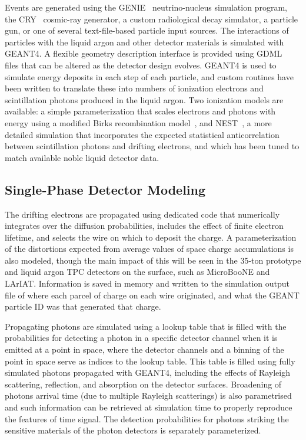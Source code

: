 Events are generated using the GENIE~\cite{GENIE} neutrino-nucleus
simulation program, the CRY~\cite{Cosmic-CRY,Cosmic-CRY-protons,CRY-url} 
cosmic-ray generator, a custom radiological decay simulator, a particle gun, or one of several
text-file-based particle input sources.  The interactions of particles
with the liquid argon and other detector materials is simulated with
GEANT4.  A flexible geometry description interface is provided using
GDML~\cite{gdml} files that can be altered as the detector design
evolves.  GEANT4 is used to simulate energy deposits in each step of
each particle, and custom routines have been written to translate
these into numbers of ionization electrons and scintillation photons
produced in the liquid argon.  Two ionization models are available: a
simple parameterization that scales electrons and photons with energy
using a modified Birks recombination model~\cite{Birks:1964zz,Doke:1988dp}, and
NEST~\cite{Szydagis:2013sih,Szydagis:2011tk}, a more detailed simulation that incorporates the
expected statistical anticorrelation between scintillation photons and
drifting electrons, and which has been tuned to match available noble
liquid detector data.

\subsection{Single-Phase Detector Modeling}

The drifting electrons are propagated using dedicated code that
numerically integrates over the diffusion probabilities, includes the
effect of finite electron lifetime, and selects the wire on which to
deposit the charge.  A parameterization of the distortions expected
from average values of space charge accumulations is also modeled,
though the main impact of this will be seen in the 35-ton prototype
and liquid argon TPC detectors on the surface, such as
MicroBooNE and LArIAT.  Information is
saved in memory and written to the simulation output file of where
each parcel of charge on each wire originated, and what the GEANT
particle ID was that generated that charge.

Propagating photons are simulated using a lookup table that is filled
with the probabilities for detecting a photon in a specific detector channel
when it is emitted at a point in space, where the detector channels
and a binning of the point in space serve as indices to the lookup table.
This table is filled using fully simulated photons propagated with GEANT4, including the effects
of Rayleigh scattering, reflection, and absorption on the detector
surfaces.  
Broadening of  photons arrival time (due to multiple Rayleigh scatterings)
is also parametrised and such information can be retrieved at simulation time
to properly reproduce the features of time signal.
The detection probabilities for photons striking the
sensitive materials of the photon detectors is separately
parameterized.


